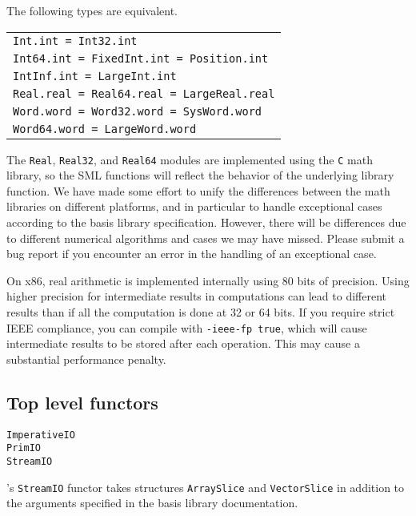 

The following types are equivalent.\\
\begin{tabular}{l}
\tt Int.int = Int32.int\\
\tt Int64.int = FixedInt.int = Position.int\\
\tt IntInf.int = LargeInt.int\\
\tt Real.real = Real64.real = LargeReal.real\\
\tt Word.word = Word32.word = SysWord.word\\
\tt Word64.word = LargeWord.word
\end{tabular}

The {\tt Real}, {\tt Real32}, and {\tt Real64} modules are implemented
using the {\tt C} math library, so the SML functions will reflect the
behavior of the underlying library function.  We have made some effort
to unify the differences between the math libraries on different
platforms, and in particular to handle exceptional cases according to
the basis library specification.  However, there will be differences
due to different numerical algorithms and cases we may have missed.
Please submit a bug report if you encounter an error in the handling
of an exceptional case.

On x86, real arithmetic is implemented internally using 80 bits of
precision.  Using higher precision for intermediate results in
computations can lead to different results than if all the computation
is done at 32 or 64 bits.  If you require strict IEEE compliance, you
can compile with {\tt -ieee-fp true}, which will cause intermediate
results to be stored after each operation.  This may cause a
substantial performance penalty.
%
\subsection{Top level functors}

{\tt ImperativeIO}\\
{\tt PrimIO}\\
{\tt StreamIO}

{\mlton}'s {\tt StreamIO} functor takes structures {\tt ArraySlice}
and {\tt VectorSlice} in addition to the arguments specified in the
basis library documentation.

